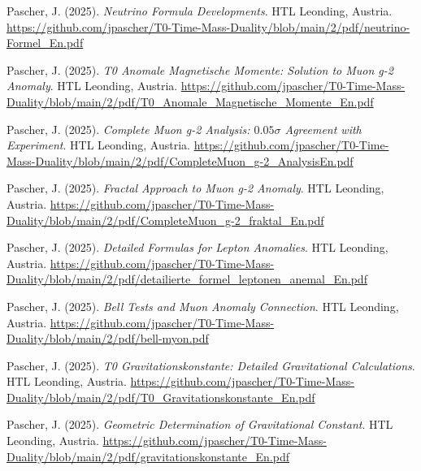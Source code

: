 \documentclass{article}
\begin{document}
\begin{thebibliography}{99}
		Pascher, J. (2025).
		\textit{Neutrino Formula Developments}.
		HTL Leonding, Austria.
		\url{https://github.com/jpascher/T0-Time-Mass-Duality/blob/main/2/pdf/neutrino-Formel_En.pdf}
		
		
		Pascher, J. (2025).
		\textit{T0 Anomale Magnetische Momente: Solution to Muon g-2 Anomaly}.
		HTL Leonding, Austria.
		\url{https://github.com/jpascher/T0-Time-Mass-Duality/blob/main/2/pdf/T0_Anomale_Magnetische_Momente_En.pdf}
		
		Pascher, J. (2025).
		\textit{Complete Muon g-2 Analysis: $0.05\sigma$ Agreement with Experiment}.
		HTL Leonding, Austria.
		\url{https://github.com/jpascher/T0-Time-Mass-Duality/blob/main/2/pdf/CompleteMuon_g-2_AnalysisEn.pdf}
		
		Pascher, J. (2025).
		\textit{Fractal Approach to Muon g-2 Anomaly}.
		HTL Leonding, Austria.
		\url{https://github.com/jpascher/T0-Time-Mass-Duality/blob/main/2/pdf/CompleteMuon_g-2_fraktal_En.pdf}
		
		Pascher, J. (2025).
		\textit{Detailed Formulas for Lepton Anomalies}.
		HTL Leonding, Austria.
		\url{https://github.com/jpascher/T0-Time-Mass-Duality/blob/main/2/pdf/detailierte_formel_leptonen_anemal_En.pdf}
		
		Pascher, J. (2025).
		\textit{Bell Tests and Muon Anomaly Connection}.
		HTL Leonding, Austria.
		\url{https://github.com/jpascher/T0-Time-Mass-Duality/blob/main/2/pdf/bell-myon.pdf}
		
		
		Pascher, J. (2025).
		\textit{T0 Gravitationskonstante: Detailed Gravitational Calculations}.
		HTL Leonding, Austria.
		\url{https://github.com/jpascher/T0-Time-Mass-Duality/blob/main/2/pdf/T0_Gravitationskonstante_En.pdf}
		
		Pascher, J. (2025).
		\textit{Geometric Determination of Gravitational Constant}.
		HTL Leonding, Austria.
		\url{https://github.com/jpascher/T0-Time-Mass-Duality/blob/main/2/pdf/gravitationskonstante_En.pdf}
		
		

\end{thebibliography}
\end{document}
